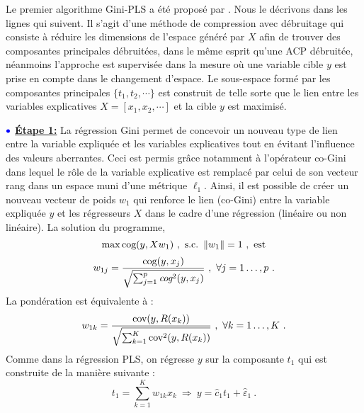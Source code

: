 Le premier algorithme Gini-PLS a été proposé par \citet{mussard2018ginipls}. Nous le décrivons dans les lignes qui suivent. Il s'agit d'une méthode de compression avec débruitage qui consiste à réduire les dimensions de l'espace généré par $X$ afin de trouver des composantes principales débruitées, dans le même esprit qu'une ACP débruitée, néanmoins l'approche est supervisée dans la mesure où une variable cible $y$ est prise en compte dans le changement d'espace. Le sous-espace formé par les composantes principales $\{t_1,t_2,\cdots\}$ est construit de telle sorte que le lien entre les variables explicatives $X = [x_1,x_2,\cdots]$ et la cible $y$ est maximisé.  

\medskip

$\bulle$ \underline{\textbf{Étape 1:}} La régression Gini permet de concevoir un nouveau type de lien entre la variable expliquée et les variables explicatives tout en évitant l'influence des valeurs aberrantes. Ceci est permis grâce notamment à l'opérateur co-Gini dans lequel le rôle de la variable explicative est remplacé par celui de son vecteur rang dans un espace muni d'une métrique $\ell_1$.  Ainsi, il est possible de créer un nouveau vecteur de poids $w_1$ qui renforce le lien (co-Gini) entre la variable expliquée $y$ et les régresseurs $X$ dans le cadre d'une régression (linéaire ou non linéaire).
\newline La solution du programme,
\[
\max \cog(y,X w_1) \ , \ \text{s.c.} \ \left\|w_1\right\|=1 \ , \ \text{est}
\]
\begin{equation}\notag
w_{1j} = \frac{\text{cog}(y,x_j)}{\sqrt{\sum_{j=1}^p \emph{cog}^2(y,x_j)}} \ , \ \forall j = 1\ldots,p \ .
\end{equation}
La pondération est équivalente à :
\begin{equation}\notag
w_{1k} = \frac{\text{cov}(y,R(x_k))}{\sqrt{\sum_{k=1}^K \text{cov}^2(y,R(x_k))}} \ , \ \forall k = 1\ldots,K \ .
\end{equation}
Comme dans la régression PLS, on régresse $y$ sur la composante $t_1$ qui est construite de la manière suivante :
\[
t_1 = \sum_{k=1}^K w_{1k}x_k \ \Longrightarrow \ y = \hat{c}_1 t_1 + \hat{\varepsilon}_1 \ .
\]

\medskip

